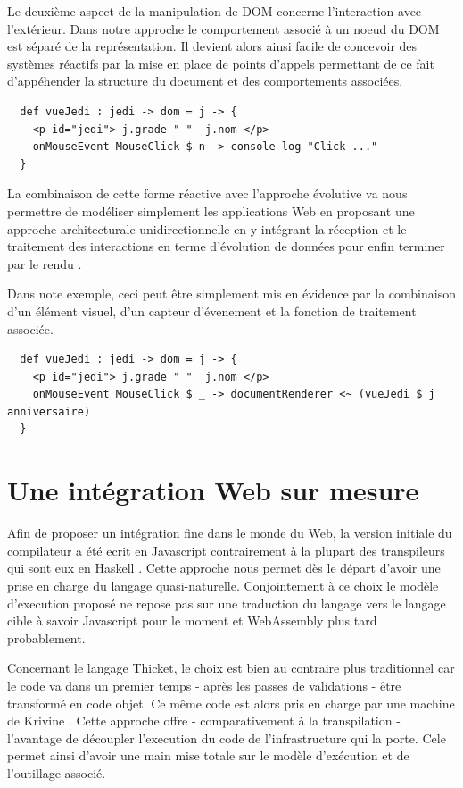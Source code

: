 \documentclass[twoside,a4paper]{article}
\begin{document}
Le deuxième  aspect de la  manipulation de DOM  concerne l'interaction
avec l'extérieur.   Dans notre approche  le comportement associé  à un
noeud du DOM est séparé de  la représentation.  Il devient alors ainsi
facile de  concevoir des  systèmes réactifs  par la  mise en  place de
points d'appels  permettant de  ce fait  d'appéhender la  structure du
document et des comportements associées.

\begin{lstlisting}
  def vueJedi : jedi -> dom = j -> {
    <p id="jedi"> j.grade " "  j.nom </p> 
    onMouseEvent MouseClick $ n -> console log "Click ..."
  }
\end{lstlisting}

La combinaison  de cette forme  réactive avec l'approche  évolutive va
nous  permettre  de  modéliser  simplement  les  applications  Web  en
proposant     une     approche    architecturale     unidirectionnelle
\cite{unidirectionnal} en  y intégrant  la réception et  le traitement
des interactions en  terme d'évolution de données  pour enfin terminer
par le rendu .
 
Dans note  exemple, ceci peut être  simplement mis en évidence  par la
combinaison  d'un  élément  visuel,  d'un capteur  d'évenement  et  la
fonction de traitement associée.

\begin{lstlisting}
  def vueJedi : jedi -> dom = j -> {
    <p id="jedi"> j.grade " "  j.nom </p> 
    onMouseEvent MouseClick $ _ -> documentRenderer <~ (vueJedi $ j anniversaire)
  }
\end{lstlisting}

\section{Une intégration Web sur mesure}

Afin de proposer un intégration fine  dans le monde du Web, la version
initiale du compilateur  a été ecrit en Javascript  contrairement à la
plupart  des   transpileurs  qui   sont  eux  en   Haskell  \cite{elm}
\cite{purescript}. Cette  approche nous  permet dès le  départ d'avoir
une prise  en charge  du langage  quasi-naturelle. Conjointement  à ce
choix le modèle  d'execution proposé ne repose pas  sur une traduction
du langage vers le langage cible à savoir Javascript pour le moment et
WebAssembly \cite{rossberg2016webassembly} plus  tard probablement. 

Concernant le  langage Thicket,  le choix est  bien au  contraire plus
traditionnel car le  code va dans un premier temps  - après les passes
de validations - être transformé en code objet. Ce même code est alors
pris en charge  par une machine de  Krivine \cite{krivine:2007}. Cette
approche offre  - comparativement à  la transpilation -  l'avantage de
découpler l'execution du  code de l'infrastructure qui  la porte. Cele
permet ainsi d'avoir une main mise totale sur le modèle d'exécution et
de l'outillage associé.
\end{document}
